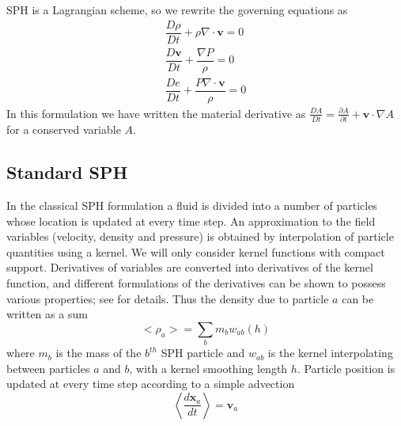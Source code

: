 \documentclass[preprint,12pt,authoryear]{elsarticle}
\begin{document}
SPH is a Lagrangian scheme, so we rewrite the governing equations as
\begin{align}   %
\dfrac{D \rho}{D t} + \rho \nabla \cdot \textbf{v} = 0 \label{eq:gov-nc-rho}\\
\dfrac{D \textbf{v}}{D t} + \dfrac{\nabla P}{\rho} =0 \label{eq:gov-nc-v}\\
\dfrac{D e}{D t} + \dfrac{P \nabla \cdot \textbf{v}}{\rho} = 0 \label{eq:gov-nc-e}
\end{align}
In this formulation we have written the material derivative as 
$\frac{D A}{Dt} = \frac{\partial A}{\partial t} + \textbf{v} \cdot \nabla A$ for a conserved variable $A$.

\subsection{Standard SPH} \label{standard-sph}
In the classical SPH formulation a fluid is divided into a number of particles whose location is updated at every time step. An approximation to the field variables (velocity, density and pressure) is obtained by interpolation of particle quantities using a kernel.
We will only consider kernel functions with compact support. Derivatives of variables are converted into derivatives of the kernel function, and different formulations of the derivatives can be shown to possess various properties; see \citep{monaghan1992smoothed,monaghan2005smoothed,liu2010smoothed, price2012smoothed} for details. Thus the density due to particle $a$ can be written as a sum
\begin{equation}
<\rho_a> = \sum_b m_b w_{ab} \left(h\right) \label{eq:ns-sph-d}
\end{equation}
where $m_b$ is the  mass of the $b^{th}$ SPH particle and $w_{ab}$ is the kernel interpolating between particles $a$ and $b$, with a kernel smoothing length $h$. Particle position is updated at every time step according to a simple advection
\begin{equation}
\left\langle\dfrac{d \textbf{x}_a}{dt}\right\rangle = \textbf{v}_a \label{eq:SPH-update-pos}
\end{equation}
\end{document}
